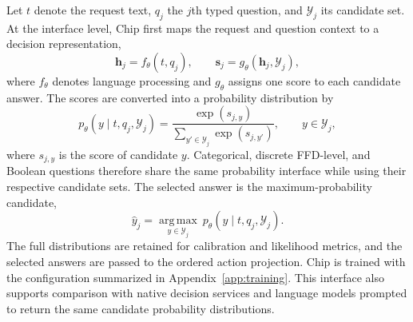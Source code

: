 \documentclass[a4paper,fleqn]{cas-dc}
\begin{document}
Let $t$ denote the request text, $q_j$ the $j$th typed question, and
$\mathcal{Y}_j$ its candidate set. At the interface level, Chip first maps the
request and question context to a decision representation,
\begin{equation}
 \mathbf{h}_j=f_{\theta}(t,q_j),
 \qquad
 \mathbf{s}_j=g_{\theta}(\mathbf{h}_j,\mathcal{Y}_j),
 \label{eq:chip-interface}
\end{equation}
where $f_{\theta}$ denotes language processing and $g_{\theta}$ assigns one
score to each candidate answer. The scores are converted into a probability
distribution by
\begin{equation}
 p_{\theta}(y\mid t,q_j,\mathcal{Y}_j)
 =\frac{\exp(s_{j,y})}{\sum_{y'\in\mathcal{Y}_j}\exp(s_{j,y'})},
 \qquad y\in\mathcal{Y}_j,
 \label{eq:decision-distribution}
\end{equation}
where $s_{j,y}$ is the score of candidate $y$. Categorical, discrete FFD-level,
and Boolean questions therefore share the same probability interface while using
their respective candidate sets. The selected answer is the maximum-probability
candidate,
\begin{equation}
 \hat{y}_j=\underset{y\in\mathcal{Y}_j}{\operatorname{arg\,max}}
          \ p_{\theta}(y\mid t,q_j,\mathcal{Y}_j).
 \label{eq:decision-selection}
\end{equation}
The full distributions are retained for calibration and likelihood metrics, and
the selected answers are passed to the ordered action projection. Chip is trained
with the configuration summarized in Appendix~\ref{app:training}. This interface
also supports comparison with native decision services and language models
prompted to return the same candidate probability distributions.
\end{document}
